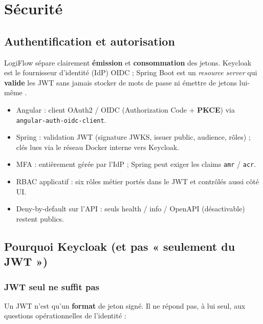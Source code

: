 \chapter{Sécurité}
\label{chap:securite}

\section{Authentification et autorisation}

LogiFlow sépare clairement \textbf{émission} et \textbf{consommation} des jetons.
Keycloak est le fournisseur d'identité (IdP) OIDC ; Spring Boot est un
\emph{resource server} qui \textbf{valide} les JWT sans jamais stocker de mots de passe
ni émettre de jetons lui-même \cite{keycloak}.


\begin{itemize}[leftmargin=*]
  \item Angular : client OAuth2 / OIDC (Authorization Code + \textbf{PKCE}) via
        \texttt{angular-auth-oidc-client}.
  \item Spring : validation JWT (signature JWKS, issuer public, audience, rôles) ;
        clés lues via le réseau Docker interne vers Keycloak.
  \item MFA : entièrement gérée par l'IdP ; Spring peut exiger les claims \texttt{amr} / \texttt{acr}.
  \item RBAC applicatif : six rôles métier portés dans le JWT et contrôlés aussi côté UI.
  \item Deny-by-default sur l'API : seuls health / info / OpenAPI (désactivable) restent publics.
\end{itemize}


\section{Pourquoi Keycloak (et pas « seulement du JWT »)}

\subsection{JWT seul ne suffit pas}

Un JWT n'est qu'un \textbf{format} de jeton signé. Il ne répond pas, à lui seul, aux questions
opérationnelles de l'identité :

